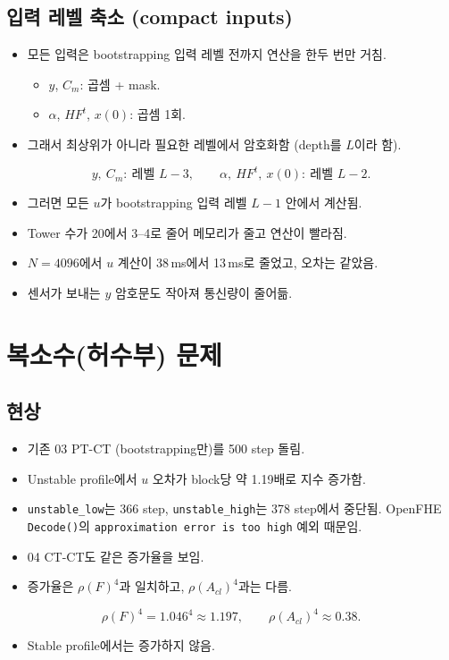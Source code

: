 \documentclass[11pt,a4paper]{article}
\begin{document}
\subsection{입력 레벨 축소 (compact inputs)}
\begin{itemize}
\item 모든 입력은 bootstrapping 입력 레벨 전까지 연산을 한두 번만 거침.
  \begin{itemize}
  \item $y$, $C_m$: 곱셈 + mask.
  \item $\alpha$, $HF^t$, $x(0)$: 곱셈 1회.
  \end{itemize}
\item 그래서 최상위가 아니라 필요한 레벨에서 암호화함 (depth를 $L$이라 함).
\end{itemize}
\begin{equation}
y,\ C_m:\ \text{레벨 }L-3,\qquad \alpha,\ HF^t,\ x(0):\ \text{레벨 }L-2 .
\end{equation}
\begin{itemize}
\item 그러면 모든 $u$가 bootstrapping 입력 레벨 $L-1$ 안에서 계산됨.
\item Tower 수가 20에서 3--4로 줄어 메모리가 줄고 연산이 빨라짐.
\item $N=4096$에서 $u$ 계산이 38\,ms에서 13\,ms로 줄었고, 오차는 같았음.
\item 센서가 보내는 $y$ 암호문도 작아져 통신량이 줄어듦.
\end{itemize}

\section{복소수(허수부) 문제}\label{sec:imag}

\subsection{현상}
\begin{itemize}
\item 기존 03 PT-CT (bootstrapping만)를 500 step 돌림.
\item Unstable profile에서 $u$ 오차가 block당 약 1.19배로 지수 증가함.
\item \texttt{unstable\_low}는 366 step, \texttt{unstable\_high}는 378 step에서 중단됨.
      OpenFHE \texttt{Decode()}의 \texttt{approximation error is too high} 예외 때문임.
\item 04 CT-CT도 같은 증가율을 보임.
\item 증가율은 $\rho(F)^4$과 일치하고, $\rho(A_{cl})^4$과는 다름.
\end{itemize}
\begin{equation}
\rho(F)^4=1.046^4\approx1.197,\qquad \rho(A_{cl})^4\approx0.38 .
\end{equation}
\begin{itemize}
\item Stable profile에서는 증가하지 않음.
\end{itemize}
\end{document}
